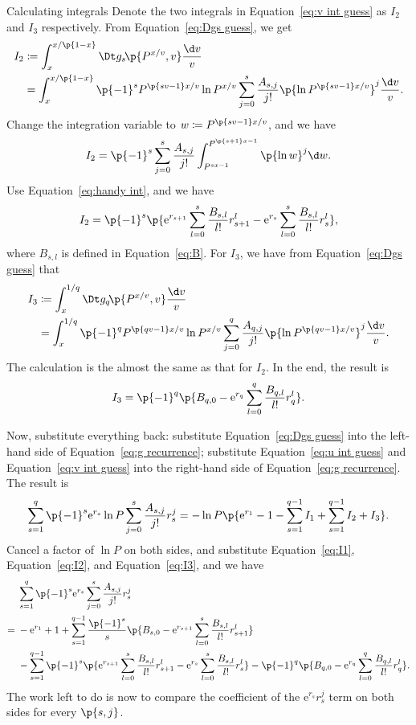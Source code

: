 \documentclass[oneside,12pt,final]{ucthesis-CA2012}
\newcommand{\mrm}[1]{\mathrm{#1}}
\newcommand{\ceq}{\coloneqq}
\newcommand{\e}{\mrm{e}}
\newcommand{\fr}{\frac}
\newcommand{\fc}[2]{#1\mathchoice{\!}{\!}{}{}\p{#2}} %
\begin{document}
\begin{mainmatter}
\begin{section}{Calculating integrals}
Denote the two integrals in Equation~\ref{eq:v int guess} as $I_2$ and $I_3$ respectively.
From Equation~\ref{eq:Dgs guess}, we get
\begin{align*}
	I_2&\ceq\int_x^{x/\p{1-x}}\fc{\Dt g_s}{P^{x/v},v}\fr{\d v}v\\
	&=\int_x^{x/\p{1-x}}\p{-1}^sP^{\p{sv-1}x/v}\ln P^{x/v}\sum_{j=0}^s
	\fr{A_{s,j}}{j!}\p{\ln P^{\p{sv-1}x/v}}^j\fr{\d v}v.
\end{align*}
Change the integration variable to $w\ceq P^{\p{sv-1}x/v}$, and we have
\[I_2=\p{-1}^s\sum_{j=0}^s\fr{A_{s,j}}{j!}\int_{P^{sx-1}}^{P^{\p{s+1}x-1}}\p{\ln w}^j\d w.\]
Use Equation~\ref{eq:handy int}, and we have
\begin{equation}
	\label{eq:I2}
	I_2=\p{-1}^s\p{\e^{r_{s+1}}\sum_{l=0}^s\fr{B_{s,l}}{l!}r_{s+1}^l
	-\e^{r_s}\sum_{l=0}^s\fr{B_{s,l}}{l!}r_s^l},
\end{equation}
where $B_{s,l}$ is defined in Equation~\ref{eq:B}.
For $I_3$, we have from Equation~\ref{eq:Dgs guess} that
\begin{align*}
	I_3&\ceq\int_x^{1/q}\fc{\Dt g_q}{P^{x/v},v}\fr{\d v}v\\
	&=\int_x^{1/q}\p{-1}^qP^{\p{qv-1}x/v}\ln P^{x/v}\sum_{j=0}^q
	\fr{A_{q,j}}{j!}\p{\ln P^{\p{qv-1}x/v}}^j\fr{\d v}v.
\end{align*}
The calculation is the almost the same as that for $I_2$. In the end, the result is
\begin{equation}
	\label{eq:I3}
	I_3=\p{-1}^q\p{B_{q,0}-\e^{r_q}\sum_{l=0}^q\fr{B_{q,l}}{l!}r_q^l}.
\end{equation}

Now, substitute everything back:
substitute Equation~\ref{eq:Dgs guess} into the left-hand side of Equation~\ref{eq:g recurrence};
substitute Equation~\ref{eq:u int guess} and Equation~\ref{eq:v int guess}
into the right-hand side of Equation~\ref{eq:g recurrence}.
The result is
\[\sum_{s=1}^q\p{-1}^s\e^{r_s}\ln P\sum_{j=0}^s\fr{A_{s,j}}{j!}r_s^j
=-\ln P\p{\e^{r_1}-1-\sum_{s=1}^{q-1}I_1+\sum_{s=1}^{q-1}I_2+I_3}.\]
Cancel a factor of $\ln P$ on both sides,
and substitute Equation~\ref{eq:I1}, Equation~\ref{eq:I2}, and Equation~\ref{eq:I3},
and we have
\begin{equation}
	\label{eq:compare}
	\begin{split}
		&\sum_{s=1}^q\p{-1}^s\e^{r_s}\sum_{j=0}^s\fr{A_{s,j}}{j!}r_s^j\\
		={}&-\e^{r_1}+1
		+\sum_{s=1}^{q-1}\fr{\p{-1}^s}s\p{B_{s,0}-\e^{r_{s+1}}\sum_{l=0}^s\fr{B_{s,l}}{l!}r_{s+1}^l}\\
		&{}-\sum_{s=1}^{q-1}\p{-1}^s\p{\e^{r_{s+1}}\sum_{l=0}^s\fr{B_{s,l}}{l!}r_{s+1}^l
		-\e^{r_s}\sum_{l=0}^s\fr{B_{s,l}}{l!}r_s^l}
		-\p{-1}^q\p{B_{q,0}-\e^{r_q}\sum_{l=0}^q\fr{B_{q,l}}{l!}r_q^l}.
	\end{split}
\end{equation}
The work left to do is now to compare the coefficient of the $\e^{r_s}r_s^j$ term on both sides
for every $\p{s,j}$.


\end{section}
\end{mainmatter}
\end{document}
